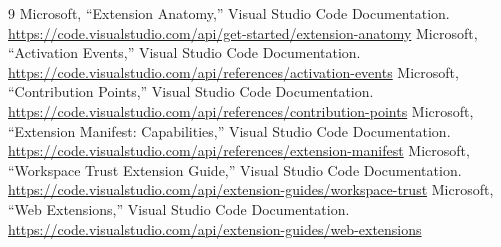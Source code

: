 \documentclass[10pt,twocolumn]{article}
\begin{document}
\balance
\begin{thebibliography}{9}
 Microsoft, ``Extension Anatomy,'' Visual Studio Code Documentation. \url{https://code.visualstudio.com/api/get-started/extension-anatomy}
 Microsoft, ``Activation Events,'' Visual Studio Code Documentation. \url{https://code.visualstudio.com/api/references/activation-events}
 Microsoft, ``Contribution Points,'' Visual Studio Code Documentation. \url{https://code.visualstudio.com/api/references/contribution-points}
 Microsoft, ``Extension Manifest: Capabilities,'' Visual Studio Code Documentation. \url{https://code.visualstudio.com/api/references/extension-manifest}
 Microsoft, ``Workspace Trust Extension Guide,'' Visual Studio Code Documentation. \url{https://code.visualstudio.com/api/extension-guides/workspace-trust}
 Microsoft, ``Web Extensions,'' Visual Studio Code Documentation. \url{https://code.visualstudio.com/api/extension-guides/web-extensions}
\end{thebibliography}
\end{document}
